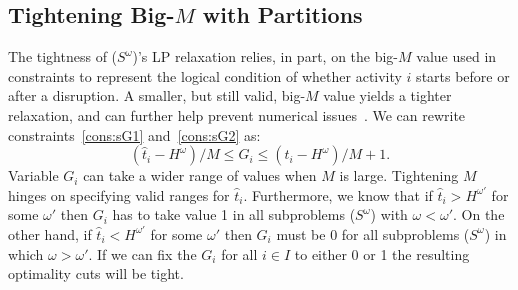 \documentclass[11pt]{article}
\begin{document}
	\subsection{Tightening Big-\(M\) with Partitions} \label{subsec:tightenM}
	The tightness of ($S^\omega$)'s LP relaxation relies, in part, on the big-$M$ value used in constraints to represent the logical condition of whether activity \(i\) starts before or after a disruption. A smaller, but still valid, big-\(M\) value yields a tighter relaxation, and can further help prevent numerical issues~\citep[e.g.,][]{camm1990cutting,klotz2013practical}. We can rewrite constraints~\eqref{cons:sG1} and~\eqref{cons:sG2} as:
	\begin{equation} \label{cons:Grange}
	(\hat{t}_i - H^\omega)/M \leq G_i \leq (\hat{t}_i - H^\omega)/M + 1.
	\end{equation}
	Variable \(G_i\) can take a wider range of values when \(M\) is large. Tightening \(M\) hinges on specifying valid ranges for \(\hat{t}_i\). Furthermore, we know that if \(\hat{t}_i > H^{\omega'}\) for some \(\omega'\) then \(G_i\) has to take value 1 in all subproblems ($S^\omega$) with \(\omega < \omega'\). On the other hand, if \(\hat{t}_i < H^{\omega'}\) for some \(\omega'\) then \(G_i\) must be 0  for all subproblems ($S^\omega$) in which \(\omega > \omega'\). If we can fix the \(G_i\) for all \(i \in I\) to either 0 or 1 the resulting optimality cuts will be tight. \\
\end{document}
